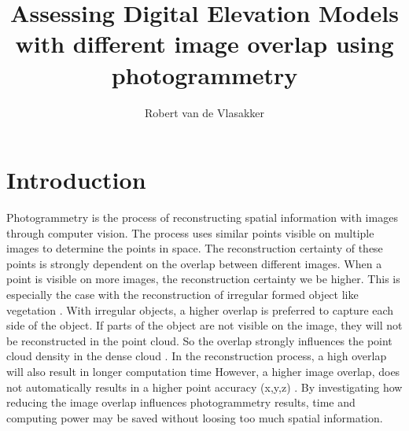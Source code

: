 \documentclass{isprs} %
\begin{document}
\title{Assessing Digital Elevation Models with different image overlap using photogrammetry}

\author{Robert van de Vlasakker}

\address{} %


\commission{}{} %
\workinggroup{} %
\icwg{}   %



\maketitle


\section{Introduction}\label{Introduction}


Photogrammetry is the process of reconstructing spatial information with images through computer vision. 
The process uses similar points visible on multiple images to determine the points in space.
The reconstruction certainty of these points is strongly dependent on the overlap between different images. 
When a point is visible on more images, the reconstruction certainty we be higher.
This is especially the case with the reconstruction of irregular formed object like vegetation \citep{AccessingImageOverlap}.
With irregular objects, a higher overlap is preferred to capture each side of the object.
If parts of the object are not visible on the image, they will not be reconstructed in the point cloud.
So the overlap strongly influences the point cloud density in the dense cloud \citep{OptimalAltOverWeath}.
In the reconstruction process, a high overlap will also result in longer computation time \citep{AccessingImageOverlap}
However, a higher image overlap, does not automatically results in a higher point accuracy (x,y,z) \citep{EffectofUABimgcamover}.
By investigating how reducing the image overlap influences photogrammetry results, time and computing power may be saved without loosing too much spatial information.
\end{document}
